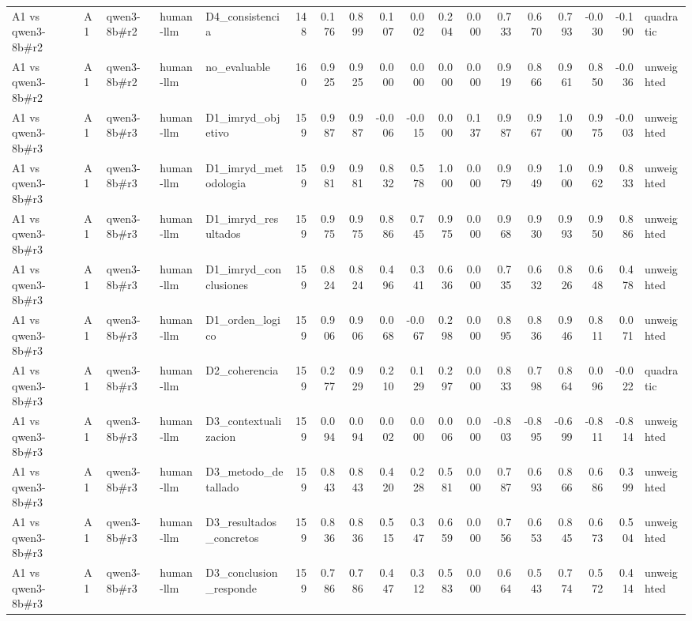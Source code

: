 \begin{table}
{\begin{tabular}{lllllrrrrrrrrrrrrl}
A1 vs qwen3-8b\#r2 & A1 & qwen3-8b\#r2 & human-llm & D4\_consistencia & 148 & 0.176 & 0.899 & 0.107 & 0.002 & 0.204 & 0.000 & 0.733 & 0.670 & 0.793 & -0.030 & -0.190 & quadratic \\
A1 vs qwen3-8b\#r2 & A1 & qwen3-8b\#r2 & human-llm & no\_evaluable & 160 & 0.925 & 0.925 & 0.000 & 0.000 & 0.000 & 0.000 & 0.919 & 0.866 & 0.961 & 0.850 & -0.036 & unweighted \\
A1 vs qwen3-8b\#r3 & A1 & qwen3-8b\#r3 & human-llm & D1\_imryd\_objetivo & 159 & 0.987 & 0.987 & -0.006 & -0.015 & 0.000 & 0.137 & 0.987 & 0.967 & 1.000 & 0.975 & -0.003 & unweighted \\
A1 vs qwen3-8b\#r3 & A1 & qwen3-8b\#r3 & human-llm & D1\_imryd\_metodologia & 159 & 0.981 & 0.981 & 0.832 & 0.578 & 1.000 & 0.000 & 0.979 & 0.949 & 1.000 & 0.962 & 0.833 & unweighted \\
A1 vs qwen3-8b\#r3 & A1 & qwen3-8b\#r3 & human-llm & D1\_imryd\_resultados & 159 & 0.975 & 0.975 & 0.886 & 0.745 & 0.975 & 0.000 & 0.968 & 0.930 & 0.993 & 0.950 & 0.886 & unweighted \\
A1 vs qwen3-8b\#r3 & A1 & qwen3-8b\#r3 & human-llm & D1\_imryd\_conclusiones & 159 & 0.824 & 0.824 & 0.496 & 0.341 & 0.636 & 0.000 & 0.735 & 0.632 & 0.826 & 0.648 & 0.478 & unweighted \\
A1 vs qwen3-8b\#r3 & A1 & qwen3-8b\#r3 & human-llm & D1\_orden\_logico & 159 & 0.906 & 0.906 & 0.068 & -0.067 & 0.298 & 0.000 & 0.895 & 0.836 & 0.946 & 0.811 & 0.071 & unweighted \\
A1 vs qwen3-8b\#r3 & A1 & qwen3-8b\#r3 & human-llm & D2\_coherencia & 159 & 0.277 & 0.929 & 0.210 & 0.129 & 0.297 & 0.000 & 0.833 & 0.798 & 0.864 & 0.096 & -0.022 & quadratic \\
A1 vs qwen3-8b\#r3 & A1 & qwen3-8b\#r3 & human-llm & D3\_contextualizacion & 159 & 0.094 & 0.094 & 0.002 & 0.000 & 0.006 & 0.000 & -0.803 & -0.895 & -0.699 & -0.811 & -0.814 & unweighted \\
A1 vs qwen3-8b\#r3 & A1 & qwen3-8b\#r3 & human-llm & D3\_metodo\_detallado & 159 & 0.843 & 0.843 & 0.420 & 0.228 & 0.581 & 0.000 & 0.787 & 0.693 & 0.866 & 0.686 & 0.399 & unweighted \\
A1 vs qwen3-8b\#r3 & A1 & qwen3-8b\#r3 & human-llm & D3\_resultados\_concretos & 159 & 0.836 & 0.836 & 0.515 & 0.347 & 0.659 & 0.000 & 0.756 & 0.653 & 0.845 & 0.673 & 0.504 & unweighted \\
A1 vs qwen3-8b\#r3 & A1 & qwen3-8b\#r3 & human-llm & D3\_conclusion\_responde & 159 & 0.786 & 0.786 & 0.447 & 0.312 & 0.583 & 0.000 & 0.664 & 0.543 & 0.774 & 0.572 & 0.414 & unweighted \\

\end{tabular}}
\end{table}

